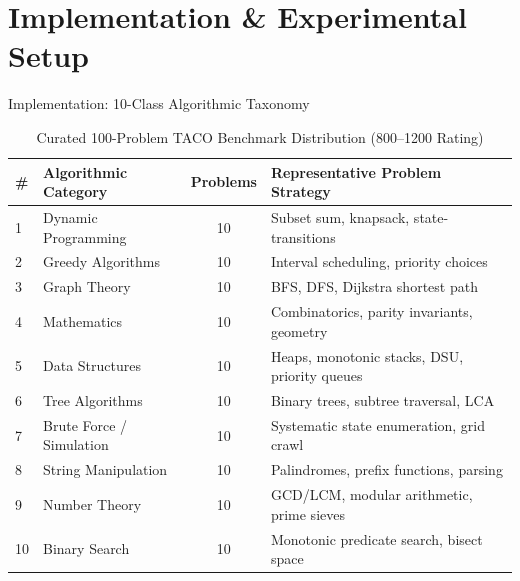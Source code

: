 \documentclass[aspectratio=169,10pt]{beamer}
\begin{document}
\section{Implementation \& Experimental Setup}

\begin{frame}{Implementation: 10-Class Algorithmic Taxonomy}
  \begin{table}[h]
    \centering
    \scriptsize
    \begin{tabular}{llcp{6.0cm}}
      \toprule
      \textbf{\#} & \textbf{Algorithmic Category} & \textbf{Problems} & \textbf{Representative Problem Strategy} \\
      \midrule
      1 & Dynamic Programming & 10 & Subset sum, knapsack, state-transitions \\
      2 & Greedy Algorithms & 10 & Interval scheduling, priority choices \\
      3 & Graph Theory & 10 & BFS, DFS, Dijkstra shortest path \\
      4 & Mathematics & 10 & Combinatorics, parity invariants, geometry \\
      5 & Data Structures & 10 & Heaps, monotonic stacks, DSU, priority queues \\
      6 & Tree Algorithms & 10 & Binary trees, subtree traversal, LCA \\
      7 & Brute Force / Simulation & 10 & Systematic state enumeration, grid crawl \\
      8 & String Manipulation & 10 & Palindromes, prefix functions, parsing \\
      9 & Number Theory & 10 & GCD/LCM, modular arithmetic, prime sieves \\
      10 & Binary Search & 10 & Monotonic predicate search, bisect space \\
      \bottomrule
    \end{tabular}
    \caption{Curated 100-Problem TACO Benchmark Distribution (800--1200 Rating)}
  \end{table}
\end{frame}
\end{document}
